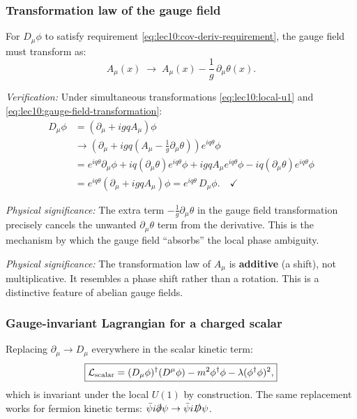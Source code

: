 \documentclass[../main.tex]{subfiles}
\begin{document}
\subsubsection*{Transformation law of the gauge field}

For $D_\mu\phi$ to satisfy requirement \eqref{eq:lec10:cov-deriv-requirement}, the gauge field must transform as:
\begin{equation}
  \boxed{
  A_\mu(x) \;\longrightarrow\; A_\mu(x) - \frac{1}{g}\,\partial_\mu\theta(x).}
  \label{eq:lec10:gauge-field-transformation}
\end{equation}

\textit{Verification:} Under simultaneous transformations \eqref{eq:lec10:local-u1} and \eqref{eq:lec10:gauge-field-transformation}:
\begin{align}
  D_\mu\phi &= (\partial_\mu + igqA_\mu)\phi \nonumber \\
  &\longrightarrow
  \left(\partial_\mu + igq\!\left(A_\mu - \tfrac{1}{g}\partial_\mu\theta\right)\right)
  e^{iq\theta}\phi \nonumber \\
  &= e^{iq\theta}\partial_\mu\phi
    + iq(\partial_\mu\theta)e^{iq\theta}\phi
    + igqA_\mu e^{iq\theta}\phi
    - iq(\partial_\mu\theta)e^{iq\theta}\phi \nonumber \\
  &= e^{iq\theta}(\partial_\mu + igqA_\mu)\phi
  = e^{iq\theta}\,D_\mu\phi. \quad\checkmark
  \label{eq:lec10:cov-deriv-check}
\end{align}

\textit{Physical significance:} The extra term $-\frac{1}{g}\partial_\mu\theta$ in the gauge field transformation precisely cancels the unwanted $\partial_\mu\theta$ term from the derivative.  This is the mechanism by which the gauge field ``absorbs'' the local phase ambiguity.

\textit{Physical significance:} The transformation law of $A_\mu$ is \textbf{additive} (a shift), not multiplicative.  It resembles a phase shift rather than a rotation.  This is a distinctive feature of abelian gauge fields.

\subsubsection*{Gauge-invariant Lagrangian for a charged scalar}

Replacing $\partial_\mu\to D_\mu$ everywhere in the scalar kinetic term:
\begin{equation}
  \boxed{
  \mathcal{L}_{\rm scalar}
  =
  (D_\mu\phi)^\dagger(D^\mu\phi) - m^2\phi^\dagger\phi - \lambda(\phi^\dagger\phi)^2,}
  \label{eq:lec10:scalar-gauge-lagrangian}
\end{equation}
which is invariant under the local $U(1)$ by construction.  The same replacement works for fermion kinetic terms: $\bar\psi i\slashed{\partial}\psi \to \bar\psi i\slashed{D}\psi$.
\end{document}
